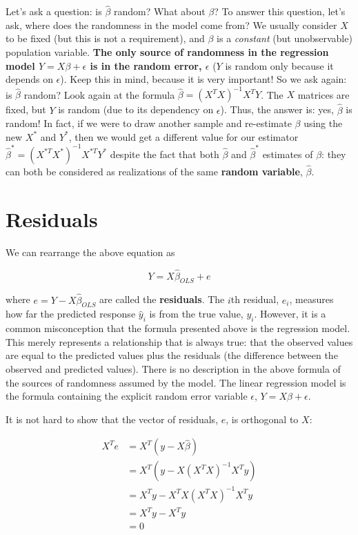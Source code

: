 Let's ask a question: is $\hat{\beta}$ random? What about $\beta$? To answer this question, let's ask, where does the randomness in the model come from? We usually consider $X$ to be fixed (but this is not a requirement), and $\beta$ is a \textit{constant} (but unobservable) population variable. {\bf The only source of randomness in the regression model $Y = X \beta + \epsilon$ is in the random error, $\epsilon$} ($Y$ is random only because it depends on $\epsilon$). Keep this in mind, because it is very important! So we ask again: is $\hat{\beta}$ random? Look again at the formula $\hat{\beta} = \left(X^TX\right)^{-1}X^T Y$. The $X$ matrices are fixed, but $Y$ is random (due to its dependency on $\epsilon$). Thus, the answer is: yes, $\hat{\beta}$ is random! In fact, if we were to draw another sample and re-estimate $\beta$ using the new $X^*$ and $Y^*$, then we would get a different value for our estimator $\hat{\beta}^* = \left(X^{*T}X^*\right)^{-1}X^{*T} Y^*$ despite the fact that both $\hat{\beta}$ and $\hat{\beta}^*$ estimates of $\beta$: they can both be considered as realizations of the same {\bf random variable}, $\hat{\beta}$. 



\section{Residuals}


We can rearrange the above equation as

$$Y = X \hat{\beta}_{OLS} + e$$

where $e = Y - X \hat{\beta}_{OLS}$ are called the {\bf residuals}. The $i$th residual, $e_i$, measures how far the predicted response $\hat{y}_i$ is from the true value, $y_i$. However, it is a common misconception that the formula presented above is the regression model. This merely represents a relationship that is always true: that the observed values are equal to the predicted values plus the residuals (the difference between the observed and predicted values). There is no description in the above formula of the sources of randomness assumed by the model. The linear regression model is the formula containing the explicit random error variable $\epsilon$, $Y = X \beta + \epsilon$.

It is not hard to show that the vector of residuals, $e$, is orthogonal to $X$:

\begin{align*}
X^Te &= X^T(y - X\hat{\beta}) \\
& = X^T(y - X(X^TX)^{-1}X^Ty)\\
& = X^Ty - X^TX(X^TX)^{-1}X^Ty\\
& = X^Ty - X^Ty\\
&= 0
\end{align*}

